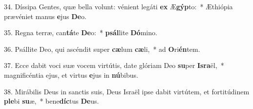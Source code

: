 34. Díssipa Gentes, quæ bella volunt: vénient legáti \textbf{ex} Æ\textbf{gýp}to:~*  Æthiópia prævéniet manus \textbf{e}jus \textbf{De}o.\

35. Regna terræ, can\textbf{tá}te \textbf{De}o:~*  \textbf{psál}lite \textbf{Dó}mino.\

36. Psállite Deo, qui ascéndit super \textbf{cæ}lum \textbf{cæ}li,~*  ad \textbf{O}ri\textbf{én}tem.\

37. Ecce dabit voci suæ vocem virtútis, date glóriam Deo \textbf{su}per \textbf{Is}\textbf{ra}ël,~*  magnificéntia ejus, et virtus \textbf{e}jus in \textbf{nú}bibus.\

38. Mirábilis Deus in sanctis suis, Deus Israël ipse dabit virtútem, et fortitúdinem \textbf{ple}bi \textbf{su}æ,~*  bene\textbf{díc}tus \textbf{De}us.\

